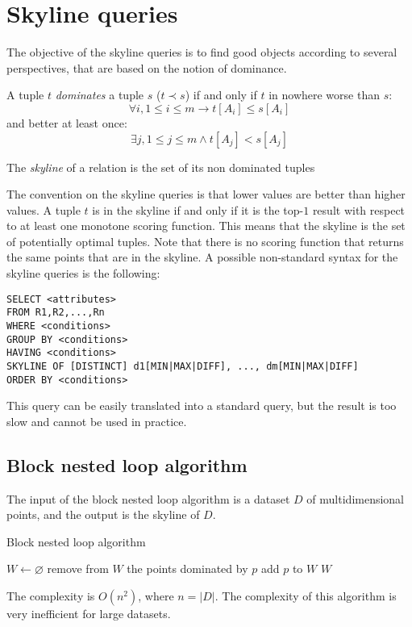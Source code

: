 \section{Skyline queries}

The objective of the skyline queries is to find good objects according to several perspectives, that are based on the notion of dominance. 
\begin{definition}
    A tuple $t$ \emph{dominates} a tuple $s$ ($t \prec s$) if and only if $t$ in nowhere worse than $s$: 
    \[\forall i, 1 \leq i \leq m \rightarrow t[A_i] \leq s[A_i]\] 
    and better at least once: 
    \[\exists j, 1 \leq j \leq m \land t[A_j] < s[A_j]\]


    The \emph{skyline} of a relation is the set of its non dominated tuples
\end{definition}
The convention on the skyline queries is that lower values are better than higher values. A tuple $t$ is in the skyline if
and only if  it is the top-$1$ result with respect to at least one monotone scoring function. This means that the skyline is the set of potentially optimal tuples. 
Note that there is no scoring function that returns the same points that are in the skyline. A possible non-standard syntax for the 
skyline queries is the following: 
\begin{lstlisting}[style=SQL]
SELECT <attributes>
FROM R1,R2,...,Rn
WHERE <conditions>
GROUP BY <conditions>
HAVING <conditions>
SKYLINE OF [DISTINCT] d1[MIN|MAX|DIFF], ..., dm[MIN|MAX|DIFF]
ORDER BY <conditions>
\end{lstlisting}
This query can be easily translated into a standard query, but the result is too slow and cannot be used in practice. 

\subsection*{Block nested loop algorithm}
The input of the block nested loop algorithm is a dataset $D$ of multidimensional points, and the output is the skyline of $D$.
\begin{algorithm}[H]
    \caption{Block nested loop algorithm}
        \begin{algorithmic}[1]
            \State $W \leftarrow \varnothing$
                    \State remove from $W$ the points dominated by $p$
                    \State add $p$ to $W$
                \EndIf
            \EndFor
            \State \Return $W$
        \end{algorithmic}
\end{algorithm}
The complexity is $O(n^2)$, where $n=\left\lvert D \right\rvert $. The complexity of this algorithm is very inefficient for large datasets. 

